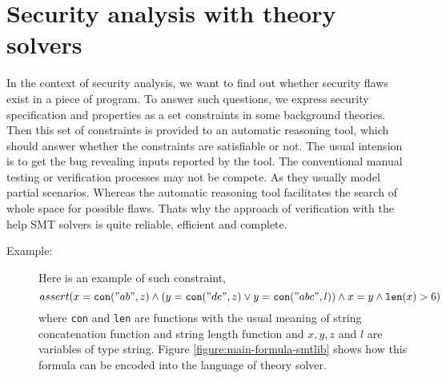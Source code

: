 \section{Security analysis with theory solvers}
In the context of security analysis, we want to find out whether security flaws exist in a piece of program. To answer such questions, we express security specification and properties as a set constraints in some background theories. Then this set of constraints is provided to an automatic reasoning tool, which should answer whether the constraints are satisfiable or not. The usual intension is to get the bug revealing inputs reported by the tool. The conventional manual testing or verification processes may not be compete. As they usually model partial scenarios. Whereas the automatic reasoning tool facilitates the search of whole space for possible flaws. Thats why the approach of verification with the help SMT solvers is quite reliable, efficient and complete.

	\begin{description}
		\item[Example:] Here is an example of such constraint,
		\begin{equation}
		\label{mainConstraint}
		assert (x =  \texttt{con}("ab", z) \wedge (y =  \texttt{con}("de", z) \vee y =  \texttt{con}("abc", l) ) \wedge x =  y \wedge \texttt{len} (x) > 6)
		\end{equation}
		where \texttt{con} and \texttt{len} are functions with the usual meaning of string concatenation function and string length function and $x, y, z$ and $l$ are variables of type string. Figure \ref{figure:main-formula-smtlib} shows how this formula can be encoded into the language of theory solver. 
	\end{description}
	

